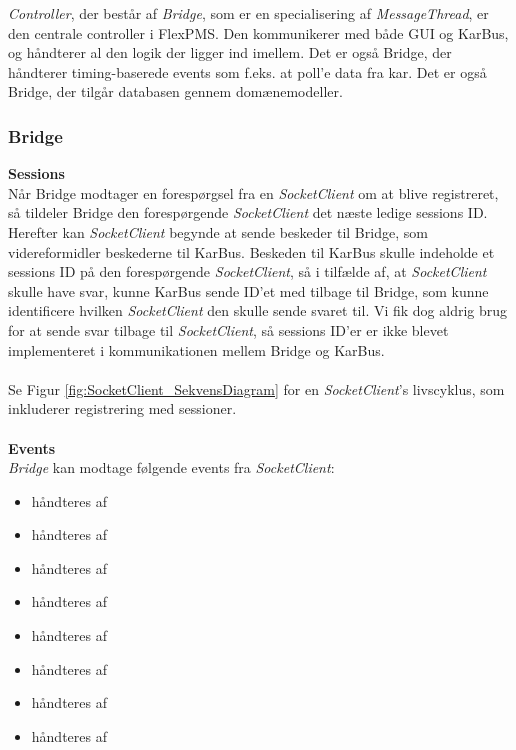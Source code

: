 \textit{Controller}, der består af \textit{Bridge}, som er en specialisering af \textit{MessageThread}, er den centrale controller i FlexPMS. Den kommunikerer med både GUI og KarBus, og håndterer al den logik der ligger ind imellem. Det er også Bridge, der håndterer timing-baserede events som f.eks. at poll'e data fra kar. Det er også Bridge, der tilgår databasen gennem domænemodeller.


\subsubsection{Bridge}


\textbf{Sessions}\\
Når Bridge modtager en forespørgsel fra en \textit{SocketClient} om at blive registreret, så tildeler Bridge den forespørgende \textit{SocketClient} det næste ledige sessions ID. Herefter kan \textit{SocketClient} begynde at sende beskeder til Bridge, som videreformidler beskederne til KarBus. Beskeden til KarBus skulle indeholde et sessions ID på den forespørgende \textit{SocketClient}, så i tilfælde af, at \textit{SocketClient} skulle have svar, kunne KarBus sende ID’et med tilbage til Bridge, som kunne identificere hvilken \textit{SocketClient} den skulle sende svaret til. Vi fik dog aldrig brug for at sende svar tilbage til \textit{SocketClient}, så sessions ID'er er ikke blevet implementeret i kommunikationen mellem Bridge og KarBus.\\\\

Se Figur \ref{fig:SocketClient_SekvensDiagram} for en \textit{SocketClient}'s livscyklus, som inkluderer registrering med sessioner.\\\\

\textbf{Events}\\

\textit{Bridge} kan modtage følgende events fra \textit{SocketClient}:

\begin{itemize}
\item {} håndteres af 
\item {} håndteres af 
\item {} håndteres af 
\item {} håndteres af 
\item {} håndteres af 
\item {} håndteres af 
\item {} håndteres af 
\item {} håndteres af 
\end{itemize}

